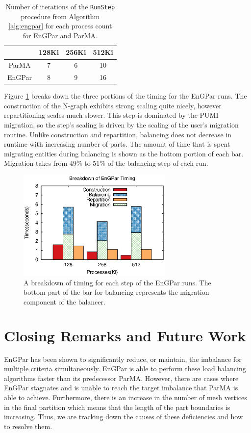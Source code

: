 \begin{table}[!h]
\centering
\begin{tabular}{||c|c|c|c||}
\hline
&128Ki&256Ki&512Ki \\
\hline
ParMA &7&6  &10  \\
EnGPar&8 &9  &16  \\
\hline
\end{tabular}
\caption{Number of iterations of the \texttt{RunStep} procedure from Algorithm \ref{alg:engpar} for each process count for EnGPar and ParMA.}
\label{tbl:steps}
\end{table}


 Figure \ref{fig:partsgraph} breaks down the three portions of the timing for
the EnGPar runs. The construction of the N-graph exhibits strong
scaling quite nicely, however repartitioning scales much slower.
This step is dominated by the PUMI migration, so the step's
scaling is driven by the scaling of the user's
migration routine.
 Unlike construction and repartition, balancing does
not decrease in runtime with increasing number of
parts. The amount of time that is spent
migrating entities during balancing is shown as the bottom
portion of each bar. Migration
takes from 49\% to 51\% of the balancing step of each run. 


\begin{figure}[!ht]
  \centering
  \includegraphics[width=3in]{results/timeparts_v_cores.eps}
  \caption{A breakdown of timing for each step of the EnGPar runs. The bottom part of the bar for balancing represents the migration component of the balancer.}
  \label{fig:partsgraph}
\end{figure}

\section{Closing Remarks and Future Work}

EnGPar has been shown to significantly reduce, or maintain, the
imbalance for multiple criteria simultaneously.
EnGPar is able to perform these load balancing
algorithms faster than its predecessor ParMA. However, there
are cases where EnGPar stagnates and is unable
to reach the target imbalance that ParMA is able
to achieve.
Furthermore, there is an increase in the number of mesh
vertices in the final partition which means that the
length of the part boundaries is increasing. Thus, we are
tracking down the causes of these deficiencies and
how to resolve them.

